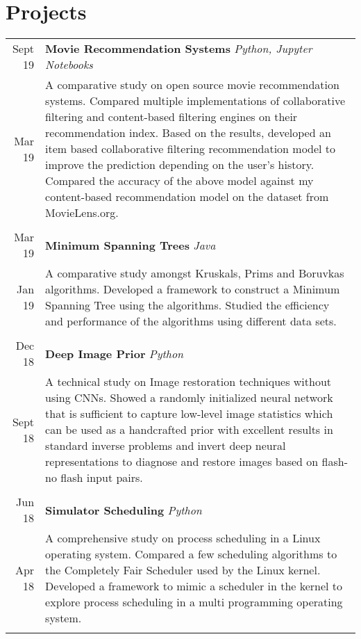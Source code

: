 \documentclass[article,10pt]{article}
\begin{document}
\section{Projects}
\begin{tabular}{r|p{16.75cm}}
Sept \textquotesingle{}19 & \textbf{Movie Recommendation Systems} \sl{Python, Jupyter Notebooks} \\
Mar \textquotesingle{}19 & \footnotesize{A comparative study on open source movie recommendation systems. Compared multiple implementations of collaborative filtering and content-based filtering engines on their recommendation index. Based on the results, developed an item based collaborative filtering recommendation model to improve the prediction depending on the user’s history. Compared the accuracy of the above model against my content-based recommendation model on the dataset from MovieLens.org.}\\ \multicolumn{2}{c}{}\\

Mar \textquotesingle{}19 & \textbf{Minimum Spanning Trees} \sl{Java} \\
Jan \textquotesingle{}19 & \footnotesize{A comparative study amongst Kruskal\textquotesingle{}s, Prim\textquotesingle{}s and Boruvka\textquotesingle{}s algorithms. Developed a framework to construct a Minimum Spanning Tree using the algorithms. Studied the efficiency and performance of the algorithms using different data sets.}\\ \multicolumn{2}{c}{} \\

Dec \textquotesingle{}18 & \textbf{Deep Image Prior} \sl{Python} \\ 
Sept \textquotesingle{}18 & \footnotesize{A technical study on Image restoration techniques without using CNN\textquotesingle{}s. Showed a randomly initialized neural network that is sufficient to capture low-level image statistics which can be used as a handcrafted prior with excellent results in standard inverse problems and invert deep neural representations to diagnose and restore images based on flash-no flash input pairs.}\\\multicolumn{2}{c}{}\\

Jun \textquotesingle{}18 & \textbf{Simulator Scheduling} \sl{Python} \\
Apr \textquotesingle{}18 & \footnotesize{A comprehensive study on process scheduling in a Linux operating system. Compared a few scheduling algorithms to the Completely Fair Scheduler used by the Linux kernel. Developed a framework to mimic a scheduler in the kernel to explore process scheduling in a multi programming operating system. }\\ \multicolumn{2}{c}{} \\


\end{tabular}
\end{document}
